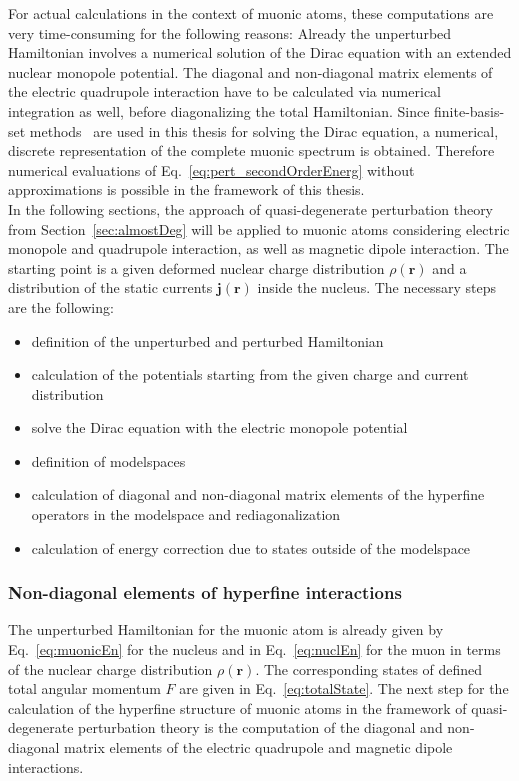 For actual calculations in the context of muonic atoms, these computations are very time-consuming for the following reasons: Already the unperturbed Hamiltonian involves a numerical solution of the Dirac equation with an extended nuclear monopole potential. The diagonal and non-diagonal matrix elements of the electric quadrupole interaction have to be calculated via numerical integration as well, before diagonalizing the total Hamiltonian. Since finite-basis-set methods~\cite{Shabaev2004} are used in this thesis for solving the Dirac equation, a numerical, discrete representation of the complete muonic spectrum is obtained. Therefore numerical evaluations of Eq.~\eqref{eq:pert_secondOrderEnerg} without approximations is possible in the framework of this thesis.\\

In the following sections, the approach of quasi-degenerate perturbation theory from Section~\ref{sec:almostDeg} will be applied to muonic atoms considering electric monopole and quadru\-pole interaction, as well as magnetic dipole interaction. The starting point is a given deformed nuclear charge distribution $\rho(\mathbf{r})$ and a distribution of the static currents $\mathbf{j}(\mathbf{r})$ inside the nucleus.
The necessary steps are the following:
\begin{itemize}
\item definition of the unperturbed  and perturbed Hamiltonian
\item calculation of the potentials starting from the given charge and current distribution
\item solve the Dirac equation with the electric monopole potential
\item definition of modelspaces
\item calculation of diagonal and non-diagonal matrix elements of the hyperfine operators in the modelspace and rediagonalization
\item calculation of energy correction due to states outside of the modelspace
\end{itemize}


\subsubsection{Non-diagonal elements of hyperfine interactions}
\label{sec:non-diagElements}
The unperturbed Hamiltonian for the muonic atom is already given by Eq.~\eqref{eq:muonicEn} for the nucleus and in Eq.~\eqref{eq:nuclEn} for the muon in terms of the nuclear charge distribution $\rho(\mathbf{r})$. The corresponding states of defined total angular momentum $F$ are given in Eq.~\eqref{eq:totalState}.
The next step for the calculation of the hyperfine structure of muonic atoms in the framework of quasi-degenerate perturbation theory is the computation of the diagonal and non-diagonal matrix elements of the electric quadrupole and magnetic dipole interactions.

